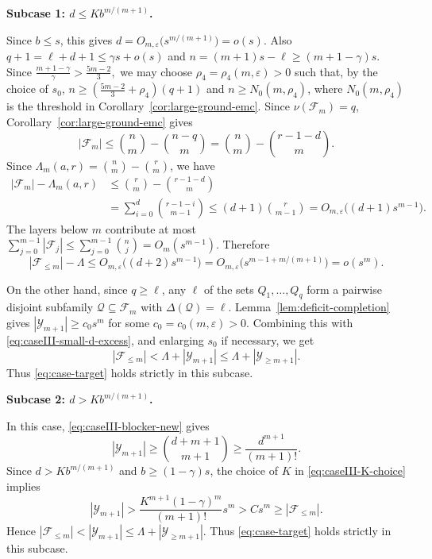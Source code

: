 \documentclass[10pt,a4paper]{article}
\numberwithin{equation}{section}
\theoremstyle{definition}
\newcommand{\F}{\mathcal F}
\newcommand{\Y}{\mathcal Y}
\begin{document}
\medskip
\noindent\textbf{Subcase 1: \(d\le Kb^{m/(m+1)}\).}
\medskip

Since \(b\le s\), this gives
\(d=O_{m,\varepsilon}\bigl(s^{m/(m+1)}\bigr)=o(s).\)
Also
\(q+1=\ell+d+1\le \gamma s+o(s)\) and \(n=(m+1)s-\ell\ge(m+1-\gamma)s\).
Since
\(\frac{m+1-\gamma}{\gamma}>\frac{5m-2}{3},\)
we may choose \(\rho_4=\rho_4(m,\varepsilon)>0\) such that, by the choice of
\(s_0\),
\(n\ge \left(\frac{5m-2}{3}+\rho_4\right)(q+1)\) and \(n\ge N_0(m,\rho_4)\),
where \(N_0(m,\rho_4)\) is the threshold in Corollary~\ref{cor:large-ground-emc}.
Since \(\nu(\F_m)=q\), Corollary~\ref{cor:large-ground-emc} gives
\[
    |\F_m|
    \le
    \binom nm-\binom{n-q}{m}
    =
    \binom nm-\binom{r-1-d}{m}.
\]
Since $\Lambda_m(a,r)=\binom{n}{m}-\binom{r}{m}$, we have
\[
    \begin{aligned}
        |\F_m|-\Lambda_m(a,r)
         & \le
        \binom rm-\binom{r-1-d}{m} \\
         & =
        \sum_{i=0}^{d}\binom{r-1-i}{m-1}
        \le
        (d+1)\binom r{m-1}
        =
        O_{m,\varepsilon}\bigl((d+1)s^{m-1}\bigr).
    \end{aligned}
\]
The layers below \(m\) contribute at most
\(\sum_{j=0}^{m-1}|\F_j| \le \sum_{j=0}^{m-1}\binom nj = O_m(s^{m-1}).\)
Therefore
\begin{equation}\label{eq:caseIII-small-d-excess}
    |\F_{\le m}|-\Lambda
    \le
    O_{m,\varepsilon}\bigl((d+2)s^{m-1}\bigr)
    =
    O_{m,\varepsilon}\bigl(s^{m-1+m/(m+1)}\bigr)
    =
    o(s^m).
\end{equation}

On the other hand, since \(q\ge\ell\), any \(\ell\) of the sets
\(Q_1,\ldots,Q_q\) form a pairwise disjoint subfamily \(\mathcal Q\subseteq\F_m\) with
\(\Delta(\mathcal Q)=\ell\).  Lemma~\ref{lem:deficit-completion} gives
\(|\Y_{m+1}|\ge c_0s^m\)
for some \(c_0=c_0(m,\varepsilon)>0\).  Combining this with
\eqref{eq:caseIII-small-d-excess}, and enlarging \(s_0\) if necessary, we get
\[
    |\F_{\le m}|
    <
    \Lambda+|\Y_{m+1}|
    \le
    \Lambda+|\Y_{\ge m+1}|.
\]
Thus \eqref{eq:case-target} holds strictly in this subcase.

\medskip
\noindent\textbf{Subcase 2: \(d>Kb^{m/(m+1)}\).}
\medskip

In this case, \eqref{eq:caseIII-blocker-new} gives
\[
    |\Y_{m+1}|
    \ge
    \binom{d+m+1}{m+1}
    \ge
    \frac{d^{m+1}}{(m+1)!}.
\]
Since \(d>Kb^{m/(m+1)}\) and \(b\ge(1-\gamma)s\), the choice of \(K\) in
\eqref{eq:caseIII-K-choice} implies
\[
    |\Y_{m+1}|
    >
    \frac{K^{m+1}(1-\gamma)^m}{(m+1)!}s^m
    >
    Cs^m
    \ge
    |\F_{\le m}|.
\]
Hence
\(|\F_{\le m}| < |\Y_{m+1}| \le \Lambda+|\Y_{\ge m+1}|.\)
Thus \eqref{eq:case-target} holds strictly in this subcase.
\end{document}
